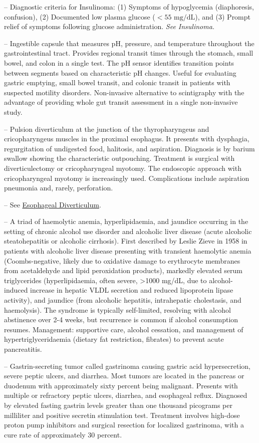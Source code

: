 -- Diagnostic criteria for Insulinoma: (1) Symptoms of hypoglycemia (diaphoresis, confusion), (2) Documented low plasma glucose ($<55\text{ mg/dL}$), and (3) Prompt relief of symptoms following glucose administration. \textit{See Insulinoma.}

-- Ingestible capsule that measures pH, pressure, and temperature throughout the gastrointestinal tract. Provides regional transit times through the stomach, small bowel, and colon in a single test. The pH sensor identifies transition points between segments based on characteristic pH changes. Useful for evaluating gastric emptying, small bowel transit, and colonic transit in patients with suspected motility disorders. Non-invasive alternative to scintigraphy with the advantage of providing whole gut transit assessment in a single non-invasive study.

-- Pulsion diverticulum at the junction of the thyropharyngeus and cricopharyngeus muscles in the proximal esophagus. It presents with dysphagia, regurgitation of undigested food, halitosis, and aspiration. Diagnosis is by barium swallow showing the characteristic outpouching. Treatment is surgical with diverticulectomy or cricopharyngeal myotomy. The endoscopic approach with cricopharyngeal myotomy is increasingly used. Complications include aspiration pneumonia and, rarely, perforation.

-- See \hyperlink{Esophageal Diverticulum}{Esophageal Diverticulum}.

-- A triad of haemolytic anemia, hyperlipidaemia, and jaundice occurring in the setting of chronic alcohol use disorder and alcoholic liver disease (acute alcoholic steatohepatitis or alcoholic cirrhosis). First described by Leslie Zieve in 1958 in patients with alcoholic liver disease presenting with transient haemolytic anemia (Coombs-negative, likely due to oxidative damage to erythrocyte membranes from acetaldehyde and lipid peroxidation products), markedly elevated serum triglycerides (hyperlipidaemia, often severe, >1000 mg/dL, due to alcohol-induced increase in hepatic VLDL secretion and reduced lipoprotein lipase activity), and jaundice (from alcoholic hepatitis, intrahepatic cholestasis, and haemolysis). The syndrome is typically self-limited, resolving with alcohol abstinence over 2-4 weeks, but recurrence is common if alcohol consumption resumes. Management: supportive care, alcohol cessation, and management of hypertriglyceridaemia (dietary fat restriction, fibrates) to prevent acute pancreatitis.

-- Gastrin-secreting tumor called gastrinoma causing gastric acid hypersecretion, severe peptic ulcers, and diarrhea. Most tumors are located in the pancreas or duodenum with approximately sixty percent being malignant. Presents with multiple or refractory peptic ulcers, diarrhea, and esophageal reflux. Diagnosed by elevated fasting gastrin levels greater than one thousand picograms per milliliter and positive secretin stimulation test. Treatment involves high-dose proton pump inhibitors and surgical resection for localized gastrinoma, with a cure rate of approximately 30 percent.
